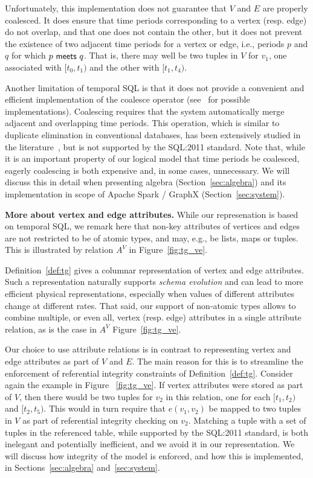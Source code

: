 Unfortunately, this implementation does not guarantee that $V$ and $E$
are properly coalesced.  It does ensure that time periods
corresponding to a vertex (resp. edge) do not overlap, and that one
does not contain the other, but it does not prevent the existence of
two adjacent time periods for a vertex or edge, i.e., periods $p$ and
$q$ for which $p~\mathsf{meets}~q$.  That is, there may well be
two tuples in $V$ for $v_1$, one associated with $[t_0,t_1)$ and the
  other with $[t_1,t_4)$.

Another limitation of temporal SQL is that it does not provide a
convenient and efficient implementation of the coalesce operator
(see~\cite{DBLP:reference/db/Bohlen09} for possible implementations).
Coalescing requires that the system automatically merge adjacent and
overlapping time periods.  This operation, which is similar to
duplicate elimination in conventional databases, has been extensively
studied in the
literature~\cite{DBLP:conf/vldb/BohlenSS96,DBLP:journals/sigmod/Zimanyi06},
but is not supported by the SQL:2011 standard.  Note that, while it is
an important property of our logical model that time periods be
coalesced, eagerly coalescing is both expensive and, in some cases,
unnecessary.  We will discuss this in detail when presenting \tg
algebra (Section~\ref{sec:algebra}) and its implementation in scope of
Apache Spark / GraphX (Section~\ref{sec:system}).

{\bf More about vertex and edge attributes.} While our represenation
is based on temporal SQL, we remark here that non-key attributes of
vertices and edges are not restricted to be of atomic types, and may,
e.g., be lists, maps or tuples. This is illustrated by relation $A^V$
in Figure~\ref{fig:tg_ve}.

Definition~\ref{def:tg} gives a columnar representation of vertex and
edge attributes.  Such a representation naturally supports {\em schema
  evolution} and can lead to more efficient physical representations,
especially when values of different attributes change at different
rates.  That said, our support of non-atomic types allows to combine
multiple, or even all, vertex (resp. edge) attributes in a single
attribute relation, as is the case in $A^V$ Figure~\ref{fig:tg_ve}.

Our choice to use attribute relations is in contrast to representing
vertex and edge attributes as part of $V$ and $E$.  The main reason
for this is to streamline the enforcement of referential integrity
constraints of Definition~\ref{def:tg}.  Consider again the example in
Figure ~\ref{fig:tg_ve}.  If vertex attributes were stored as part of
$V$, then there would be two tuples for $v_2$ in this relation, one
for each $[t_1, t_2)$ and $[t_2, t_5)$.  This would in turn require
    that $e(v_1, v_2)$ be mapped to two tuples in $V$ as part of
    referential integrity checking on $v_2$.  Matching a tuple with a
    set of tuples in the referenced table, while supported by the
    SQL:2011 standard, is both inelegant and potentially inefficient,
    and we avoid it in our representation.  We will discuss how
    integrity of the model is enforced, and how this is implemented,
    in Sections~\ref{sec:algebra} and~\ref{sec:system}.

